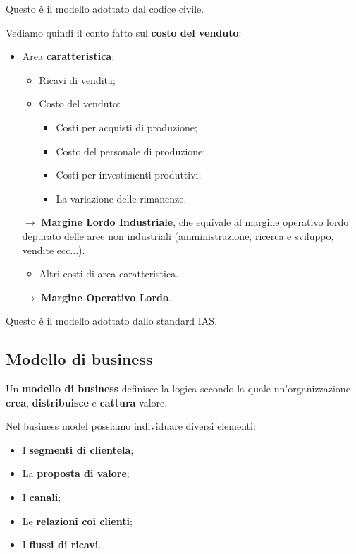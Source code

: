 \documentclass[a4paper,11pt]{article}
\begin{document}
Questo è il modello adottato dal codice civile.

Vediamo quindi il conto fatto sul \textbf{costo del venduto}:
\begin{itemize}
	\item Area \textbf{caratteristica}:
		\begin{itemize}
			\item Ricavi di vendita;
			\item Costo del venduto:
				\begin{itemize}
					\item Costi per acquisti di produzione;
					\item Costo del personale di produzione;
					\item Costi per investimenti produttivi;
					\item La variazione delle rimanenze.
				\end{itemize}
		\end{itemize}
		$\rightarrow$ \textbf{Margine Lordo Industriale}, che equivale al margine operativo lordo depurato delle aree non industriali (amministrazione, ricerca e sviluppo, vendite ecc...).
		\begin{itemize}
			\item Altri costi di area caratteristica.
		\end{itemize}
		$\rightarrow$ \textbf{Margine Operativo Lordo}.

\end{itemize}

Questo è il modello adottato dallo standard IAS.

\subsection{Modello di business}
Un \textbf{modello di business} definisce la logica secondo la quale un'organizzazione \textbf{crea}, \textbf{distribuisce} e \textbf{cattura} valore.

Nel business model possiamo individuare diversi elementi:
\begin{itemize}
	\item I \textbf{segmenti di clientela};
	\item La \textbf{proposta di valore};
	\item I \textbf{canali};
	\item Le \textbf{relazioni coi clienti};
	\item I \textbf{flussi di ricavi}.
\end{itemize}
\end{document}
